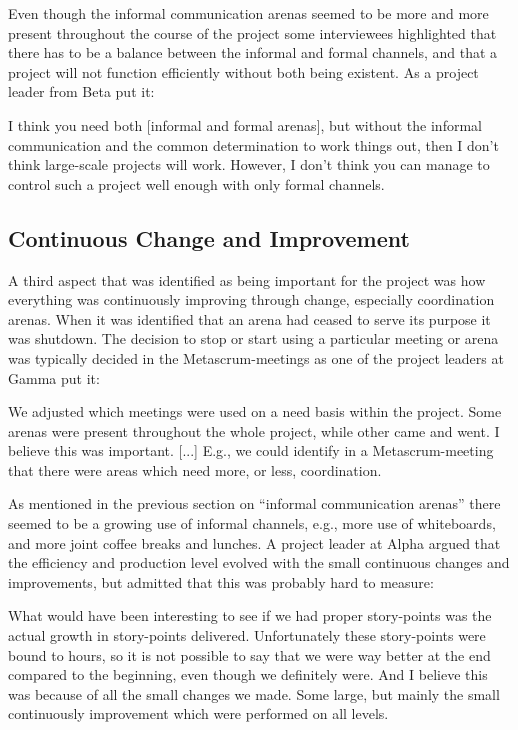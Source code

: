 Even though the informal communication arenas seemed to be more and more present throughout the course of the project some interviewees highlighted that there has to be a balance between the informal and formal channels, and that a project will not function efficiently without both being existent. As a project leader from Beta put it:

\begin{fancyquotes}
I think you need both [informal and formal arenas], but without the informal communication and the common determination to work things out, then I don't think large-scale projects will work. However, I don't think you can manage to control such a project well enough with only formal channels.
\end{fancyquotes}

\subsection{Continuous Change and Improvement}

A third aspect that was identified as being important for the project was how everything was continuously improving through change, especially coordination arenas. When it was identified that an arena had ceased to serve its purpose it was shutdown. The decision to stop or start using a particular meeting or arena was typically decided in the Metascrum-meetings as one of the project leaders at Gamma put it:

\begin{fancyquotes}
We adjusted which meetings were used on a need basis within the project. Some arenas were present throughout the whole project, while other came and went. I believe this was important. [...] E.g., we could identify in a Metascrum-meeting that there were areas which need more, or less, coordination.
\end{fancyquotes}

As mentioned in the previous section on ``informal communication arenas'' there seemed to be a growing use of informal channels, e.g., more use of whiteboards, and more joint coffee breaks and lunches. A project leader at Alpha argued that the efficiency and production level evolved with the small continuous changes and improvements, but admitted that this was probably hard to measure:

\begin{fancyquotes}
What would have been interesting to see if we had proper story-points was the actual growth in story-points delivered. Unfortunately these story-points were bound to hours, so it is not possible to say that we were way better at the end compared to the beginning, even though we definitely were. And I believe this was because of all the small changes we made. Some large, but mainly the small continuously improvement which were performed on all levels.
\end{fancyquotes}

